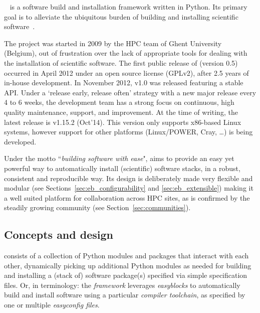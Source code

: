 \easybuild{}~\cite{EasyBuildSC12} is a software build and installation framework
written in Python. Its primary goal is to alleviate the ubiquitous burden of
building and installing scientific software~\cite{Dubois03}.

The \easybuild{} project was started in 2009 by the HPC team of Ghent
University (Belgium), out of frustration over the lack of appropriate tools for
dealing with the installation of scientific software. The first public release of
\easybuild{} (version 0.5) occurred in April 2012 under an open source license
(GPLv2), after 2.5 years of in-house
development. In November 2012, \easybuild{} v1.0 was released featuring
a stable API. Under a `release early, release often' strategy with a new major
release every 4 to 6 weeks, the development team has a strong focus on continuous,
high quality maintenance, support, and improvement. At the time of
writing, the latest release is \easybuild{} v1.15.2 (Oct'14). This version
only supports x86-based Linux systems, however support for other platforms
(Linux/POWER, Cray, \ldots) is being developed.

Under the motto ``\emph{building software with ease}", \easybuild{} aims to provide
an easy
yet powerful way to automatically install (scientific) software stacks, in a robust,
consistent and reproducible way. Its design is deliberately made very flexible and
modular (see Sections~\ref{sec:eb_configurability} and \ref{sec:eb_extensible})
making it a well suited 
platform for collaboration across HPC sites, as is
confirmed by the steadily growing \easybuild{} community (see
Section~\ref{sec:communities}).

\subsection{Concepts and design}

\easybuild{} consists of a collection of Python modules and packages that
interact with each other, dynamically picking up additional Python modules as needed
for building and installing a (stack of) software package(s) specified via simple
specification files. Or, in \easybuild{} terminology: the \easybuild{}
\emph{framework} leverages \emph{easyblocks} to automatically build and install
software using a particular \emph{compiler toolchain}, as specified by one or
multiple \emph{easyconfig files}.

